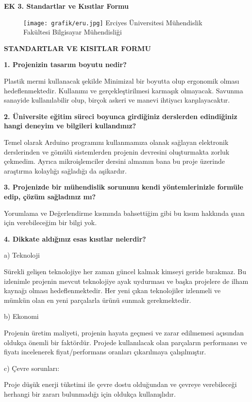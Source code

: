 \textbf{EK 3. Standartlar ve Kısıtlar Formu}
\label{CH:BolumEkler3}

\begin{figure}[H]
	\texttt{[image: grafik/eru.jpg]}
    \label{fig:EruLogoDM} \centering Erciyes Üniversitesi Mühendislik Fakültesi Bilgisayar Mühendisliği
\end{figure} 

\textbf{STANDARTLAR VE KISITLAR FORMU}
\\ \hline 

\textbf{1. Projenizin tasarım boyutu nedir?}

 	Plastik mermi kullanacak şekilde Minimizal bir boyutta olup ergonomik olması hedeflenmektedir. Kullanımı ve gerçekleştirilmesi karmaşık olmayacak. Savunma sanayide kullanılabilir olup, birçok askeri ve manevi ihtiyacı karşılayacaktır.
    
\textbf{2. Üniversite eğitim süreci boyunca girdiğiniz derslerden edindiğiniz hangi deneyim ve bilgileri kullandınız?}

	Temel olarak Arduino programını kullanmamıza olanak sağlayan elektronik derslerinden ve gömülü sistemlerden projenin devresini oluşturmakta zorluk çekmedim. Ayrıca mikroişlemciler dersini almamın bana bu proje üzerinde araştırma kolaylığı sağladığı da aşikardır.
    
\textbf{3. Projenizde bir mühendislik sorununu kendi yöntemlerinizle formüle edip, çözüm sağladınız mı? }

	Yorumlama ve Değerlendirme kısmında bahsettiğim gibi bu kısım hakkında şuan için verebileceğim bir bilgi yok.
    
\textbf{4. Dikkate aldığınız esas kısıtlar nelerdir? }

a) Teknoloji

	Sürekli gelişen teknolojiye her zaman güncel kalmak kimseyi geride bırakmaz. Bu izlenimle projenin mevcut teknolojiye ayak uydurması ve başka projelere de ilham kaynağı olması hedeflenmektedir. Her yeni çıkan teknolojiler izlenmeli ve mümkün olan en yeni parçalarla ürünü sunmak gerekmektedir.
    
 b) Ekonomi
 
	Projenin üretim maliyeti, projenin hayata geçmesi ve zarar edilmemesi açısından oldukça önemli bir faktördür. Projede kullanılacak olan parçaların performansı ve fiyatı incelenerek fiyat/performans oranları çıkarılmaya çalışılmıştır. 


c) Çevre sorunları: 

	Proje düşük enerji tüketimi ile çevre dostu olduğundan ve çevreye verebileceği herhangi bir zararı bulunmadığı için oldukça kullanışlıdır.
    
